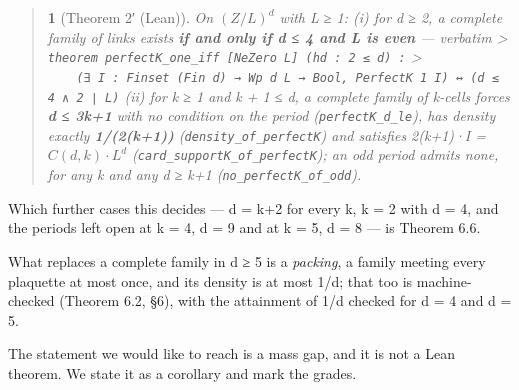 \documentclass[11pt,a4paper]{article}
\theoremstyle{named}
\newtheorem*{namedthm}{}
\begin{document}
\begin{quote}
\begin{namedthm}[Theorem 2′ (Lean)]
On $(Z/L)^d$ with L ≥ 1: (i) for d ≥ 2, a complete family of links exists \textbf{if and only if d ≤ 4 and L is even} — verbatim \textgreater{} \texttt{theorem\ \allowbreak{}perfectK\_\allowbreak{}one\_\allowbreak{}iff\ \allowbreak{}[NeZero\ \allowbreak{}L]\ \allowbreak{}(hd\ \allowbreak{}:\ \allowbreak{}2\ \allowbreak{}≤\ \allowbreak{}d)\ \allowbreak{}:} \textgreater{} \texttt{\ \allowbreak{}\ \allowbreak{}\ \allowbreak{}\ \allowbreak{}(∃\ \allowbreak{}I\ \allowbreak{}:\ \allowbreak{}Finset\ \allowbreak{}(Fin\ \allowbreak{}d)\ \allowbreak{}→\ \allowbreak{}Wp\ \allowbreak{}d\ \allowbreak{}L\ \allowbreak{}→\ \allowbreak{}Bool,\ \allowbreak{}PerfectK\ \allowbreak{}1\ \allowbreak{}I)\ \allowbreak{}↔\ \allowbreak{}(d\ \allowbreak{}≤\ \allowbreak{}4\ \allowbreak{}∧\ \allowbreak{}2\ \allowbreak{}∣\ \allowbreak{}L)} (ii) for k ≥ 1 and k + 1 ≤ d, a complete family of k-cells forces \textbf{d ≤ 3k+1} with no condition on the period (\texttt{perfectK\_\allowbreak{}d\_\allowbreak{}le}), has density exactly \textbf{1/(2(k+1))} (\texttt{density\_\allowbreak{}of\_\allowbreak{}perfectK}) and satisfies 2(k+1)·\textbar{}I\textbar{} = $C(d,k)·L^d$ (\texttt{card\_\allowbreak{}supportK\_\allowbreak{}of\_\allowbreak{}perfectK}); an odd period admits none, for any k and any d ≥ k+1 (\texttt{no\_\allowbreak{}perfectK\_\allowbreak{}of\_\allowbreak{}odd}).
\end{namedthm}
\end{quote}
Which further cases this decides — d = k+2 for every k, k = 2 with d = 4, and the periods left open at k = 4, d = 9 and at k = 5, d = 8 — is Theorem 6.6.

What replaces a complete family in d ≥ 5 is a \textit{packing}, a family meeting every plaquette at most once, and its density is at most 1/d; that too is machine-checked (Theorem 6.2, §6), with the attainment of 1/d checked for d = 4 and d = 5.

The statement we would like to reach is a mass gap, and it is not a Lean theorem. We state it as a corollary and mark the grades.
\end{document}
